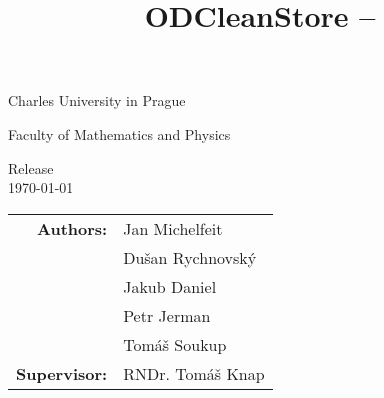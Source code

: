 \title{ODCleanStore -- \documentname}

\begin{titlepage}
\begin{center}

\large
Charles University in Prague

\smallskip

Faculty of Mathematics and Physics





\begin{spacing}{1.5} 
{\bf\Huge \documentname}
\end{spacing}

Release \version\\
\today


\begin{tabular}{rl}

\textbf{Authors:} & Jan Michelfeit \\
& Du\v san Rychnovsk\'y\\
& Jakub Daniel\\
& Petr Jerman\\
& Tom\' a\v s Soukup\\
\noalign{\vspace{3mm}}
\textbf{Supervisor:} & RNDr. Tom\' a\v s Knap
\end{tabular}

\end{center}
\end{titlepage}

\newpage